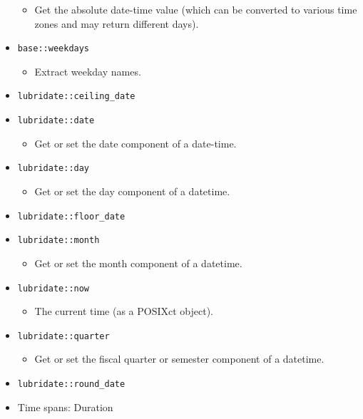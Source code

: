 \documentclass[
]{book}
\providecommand{\tightlist}{%
  \setlength{\itemsep}{0pt}\setlength{\parskip}{0pt}}
\begin{document}
\begin{itemize}
  \begin{itemize}
  \tightlist
  \item
    Get the absolute date-time value (which can be converted to various time zones and may return different days).
  \end{itemize}
\item
  \texttt{base::weekdays}

  \begin{itemize}
  \tightlist
  \item
    Extract weekday names.
  \end{itemize}
\item
  \texttt{lubridate::ceiling\_date}
\item
  \texttt{lubridate::date}

  \begin{itemize}
  \tightlist
  \item
    Get or set the date component of a date-time.
  \end{itemize}
\item
  \texttt{lubridate::day}

  \begin{itemize}
  \tightlist
  \item
    Get or set the day component of a datetime.
  \end{itemize}
\item
  \texttt{lubridate::floor\_date}
\item
  \texttt{lubridate::month}

  \begin{itemize}
  \tightlist
  \item
    Get or set the month component of a datetime.
  \end{itemize}
\item
  \texttt{lubridate::now}

  \begin{itemize}
  \tightlist
  \item
    The current time (as a POSIXct object).
  \end{itemize}
\item
  \texttt{lubridate::quarter}

  \begin{itemize}
  \tightlist
  \item
    Get or set the fiscal quarter or semester component of a datetime.
  \end{itemize}
\item
  \texttt{lubridate::round\_date}
\item
  Time spans: Duration


\end{itemize}
\end{document}
